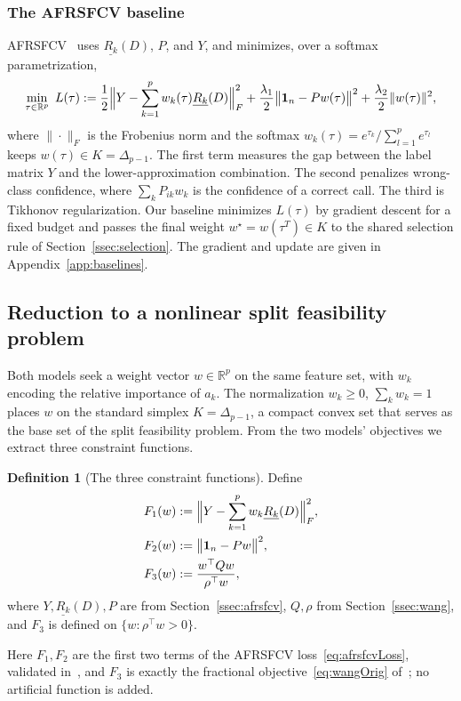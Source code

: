 \documentclass[]{interact}
\theoremstyle{plain}
\theoremstyle{definition}
\newtheorem{definition}[theorem]{Definition}
\theoremstyle{remark}
\newcommand{\R}{\mathbb{R}}
\begin{document}
\subsubsection{The AFRSFCV baseline}\label{sssec:afrsfcv-model}
AFRSFCV~\citep{wang2026afrsfcv} uses $\underline{R_k}(D)$, $P$, and $Y$, and minimizes, over a softmax parametrization,
\begin{equation}\label{eq:afrsfcvLoss}
\min_{\tau\in\R^p}\ L(\tau):=\frac12\Bigl\|Y-\sum_{k=1}^{p}w_k(\tau)\underline{R_k}(D)\Bigr\|_F^2
+\frac{\lambda_1}{2}\bigl\|\mathbf{1}_n-Pw(\tau)\bigr\|^2+\frac{\lambda_2}{2}\|w(\tau)\|^2,
\end{equation}
where $\|\cdot\|_F$ is the Frobenius norm and the softmax $w_k(\tau)=e^{\tau_k}/\sum_{l=1}^p e^{\tau_l}$ keeps $w(\tau)\in K=\Delta_{p-1}$. The first term measures the gap between the label matrix $Y$ and the lower-approximation combination. The second penalizes wrong-class confidence, where $\sum_k P_{ik}w_k$ is the confidence of a correct call. The third is Tikhonov regularization. Our baseline minimizes $L(\tau)$ by gradient descent for a fixed budget and passes the final weight $w^\star=w(\tau^T)\in K$ to the shared selection rule of Section~\ref{ssec:selection}. The gradient and update are given in Appendix~\ref{app:baselines}.

\subsection{Reduction to a nonlinear split feasibility problem}\label{ssec:reduction}
Both models seek a weight vector $w\in\R^p$ on the same feature set, with $w_k$ encoding the relative importance of $a_k$. The normalization $w_k\ge0$, $\sum_k w_k=1$ places $w$ on the standard simplex $K=\Delta_{p-1}$, a compact convex set that serves as the base set of the split feasibility problem. From the two models' objectives we extract three constraint functions.
\begin{definition}[The three constraint functions]\label{def:F123}
Define
\begin{align}
F_1(w)&:=\Bigl\|Y-\sum_{k=1}^{p}w_k\underline{R_k}(D)\Bigr\|_F^2,\label{eq:fsF1}\\
F_2(w)&:=\bigl\|\mathbf{1}_n-Pw\bigr\|^2,\label{eq:fsF2}\\
F_3(w)&:=\frac{w^{\top}Qw}{\rho^{\top}w},\label{eq:fsF3}
\end{align}
where $Y,\underline{R_k}(D),P$ are from Section~\ref{ssec:afrsfcv}, $Q,\rho$ from Section~\ref{ssec:wang}, and $F_3$ is defined on $\{w:\rho^{\top}w>0\}$.
\end{definition}
Here $F_1,F_2$ are the first two terms of the AFRSFCV loss~\eqref{eq:afrsfcvLoss}, validated in~\citep{wang2026afrsfcv}, and $F_3$ is exactly the fractional objective~\eqref{eq:wangOrig} of~\citep{wang2021fractional}; no artificial function is added.
\end{document}
